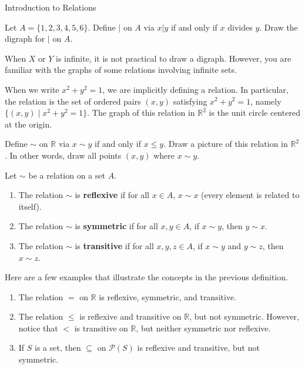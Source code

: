 \begin{section}{Introduction to Relations}
\begin{exercise}
Let $A=\{1,2,3,4,5,6\}$.  Define $|$ on $A$ via $x|y$ if and only if $x$ divides $y$.  Draw the digraph for $|$ on $A$.
\end{exercise}

When $X$ or $Y$ is infinite, it is not practical to draw a digraph.  However, you are familiar with the graphs of some relations involving infinite sets.

\begin{example}
When we write $x^2+y^2=1$, we are implicitly defining a relation.  In particular, the relation is the set of ordered pairs $(x,y)$ satisfying $x^2+y^2=1$, namely $\{(x,y)\mid x^2+y^2=1\}$. The graph of this relation in $\mathbb{R}^2$ is the unit circle centered at the origin.
\end{example}

\begin{exercise}
Define $\sim$ on $\mathbb{R}$ via $x\sim y$ if and only if $x\leq y$.  Draw a picture of this relation in $\mathbb{R}^2$. In other words, draw all points $(x,y)$ where $x\sim y$.
\end{exercise}

\begin{definition}
Let $\sim$ be a relation on a set $A$.
\begin{enumerate}[label=\textrm{(\alph*)}]
\item The relation $\sim$ is \textbf{reflexive} if for all $x\in A$, $x\sim x$ (every element is related to itself).
\item The relation $\sim$ is \textbf{symmetric} if for all $x,y\in A$, if $x\sim y$, then $y\sim x$.
\item The relation $\sim$ is \textbf{transitive} if for all $x,y,z\in A$, if $x\sim y$ and $y\sim z$, then $x\sim z$.
\end{enumerate}
\end{definition}

\begin{example}
Here are a few examples that illustrate the concepts in the previous definition.
\begin{enumerate}[label=\textrm{(\alph*)}]
\item The relation $=$ on $\mathbb{R}$ is reflexive, symmetric, and transitive.
\item The relation $\leq$ is reflexive and transitive on $\mathbb{R}$, but not symmetric. However, notice that $<$ is transitive on $\mathbb{R}$, but neither symmetric nor reflexive.
\item If $S$ is a set, then $\subseteq$ on $\mathcal{P}(S)$ is reflexive and transitive, but not symmetric.
\end{enumerate}


\end{example}
\end{section}
